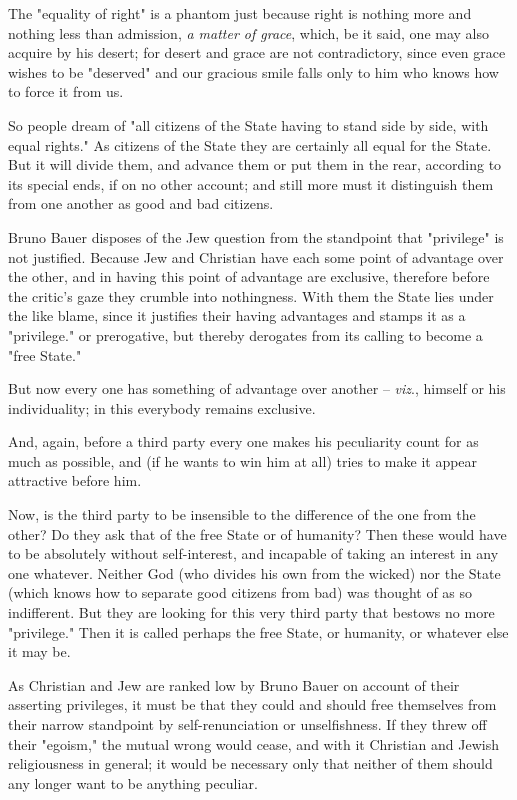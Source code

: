\documentclass[a4paper]{book}
\begin{document}
The "{}equality of right"{} is a phantom just because right is nothing more 
and nothing less than admission, \textit{a matter of grace}, which, be it 
said, one may also acquire by his desert; for desert and grace are not 
contradictory, since even grace wishes to be "{}deserved"{} and our gracious 
smile falls only to him who knows how to force it from us.

So people dream of "{}all citizens of the State having to stand side by side, 
with equal rights."{} As citizens of the State they are certainly all equal 
for the State. But it will divide them, and advance them or put them in the 
rear, according to its special ends, if on no other account; and still more 
must it distinguish them from one another as good and bad citizens.

Bruno Bauer disposes of the Jew question from the standpoint that 
"{}privilege"{} is not justified. Because Jew and Christian have each some 
point of advantage over the other, and in having this point of advantage are 
exclusive, therefore before the critic's gaze they crumble into nothingness. 
With them the State lies under the like blame, since it justifies their having 
advantages and stamps it as a "{}privilege."{} or prerogative, but thereby 
derogates from its calling to become a "{}free State."{}

But now every one has something of advantage over another -- \textit{viz}., 
himself or his individuality; in this everybody remains exclusive.

And, again, before a third party every one makes his peculiarity count for as 
much as possible, and (if he wants to win him at all) tries to make it appear 
attractive before him.

Now, is the third party to be insensible to the difference of the one from the 
other? Do they ask that of the free State or of humanity? Then these would 
have to be absolutely without self-interest, and incapable of taking an 
interest in any one whatever. Neither God (who divides his own from the 
wicked) nor the State (which knows how to separate good citizens from bad) was 
thought of as so indifferent. But they are looking for this very third party 
that bestows no more "{}privilege."{} Then it is called perhaps the free 
State, or humanity, or whatever else it may be.

As Christian and Jew are ranked low by Bruno Bauer on account of their 
asserting privileges, it must be that they could and should free themselves 
from their narrow standpoint by self-renunciation or unselfishness. If they 
threw off their "{}egoism,"{} the mutual wrong would cease, and with it 
Christian and Jewish religiousness in general; it would be necessary only that 
neither of them should any longer want to be anything peculiar.
\end{document}
